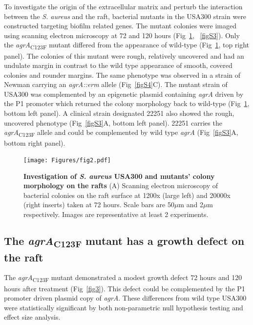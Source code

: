 \documentclass[10pt,letterpaper]{article}
\begin{document}
To investigate the origin of the extracellular matrix and perturb the interaction between the \textit{S. aureus} and the raft, bacterial mutants in the USA300 strain were constructed targeting biofilm related genes.
The mutant colonies were imaged using scanning electron microscopy at 72 and 120 hours (Fig~\ref{fig2}, ~\ref{figS3}).
Only the \textit{agrA}\textsubscript{C123F} mutant differed from the appearance of wild-type (Fig~\ref{fig2}, top right panel).
The colonies of this mutant were rough, relatively uncovered and had an undulate margin in contrast to the wild type appearance of smooth, covered colonies and rounder margins.
The same phenotype was observed in a strain of Newman carrying an \textit{agrA::erm} allele (Fig~\ref{figS4}C).
The mutant strain of USA300 was complemented by an epigenetic plasmid containing \textit{agrA} driven by the P1 promoter which returned the colony morphology back to wild-type (Fig~\ref{fig2}, bottom left panel).
A clinical strain designated 22251 also showed the rough, uncovered phenotype (Fig~\ref{figS3}A, bottom left panel).
22251 carries the \textit{agrA}\textsubscript{C123F} allele and could be complemented by wild type \textit{agrA} (Fig~\ref{figS3}A, bottom right panel).


\begin{figure}[!ht]
\begin{adjustwidth}{-2.25in}{0in}
\texttt{[image: Figures/fig2.pdf]}
\caption[Investigation of \textit{S. aureus} USA300 and mutants' colony morphology on the rafts]{
	\textbf{Investigation of \textit{S. aureus} USA300 and mutants' colony morphology on the rafts}
	(A) Scanning electron microscopy of bacterial colonies on the raft surface at 1200x (large left) and 20000x (right inserts) taken at 72 hours. Scale bars are 50$\mu$m and 2$\mu$m respectively. Images are representative at least 2 experiments.}
    \label{fig2}
    \end{adjustwidth}
\end{figure}

\subsection*{The \textit{agrA}\textsubscript{C123F} mutant has a growth defect on the raft}

The \textit{agrA}\textsubscript{C123F} mutant demonstrated a modest growth defect 72 hours and 120 hours after treatment (Fig~\ref{fig3}).
This defect could be complemented by the P1 promoter driven plasmid copy of \textit{agrA}.
These differences from wild type USA300 were statistically significant by both non-parametric null hypothesis testing and effect size analysis.
\end{document}
